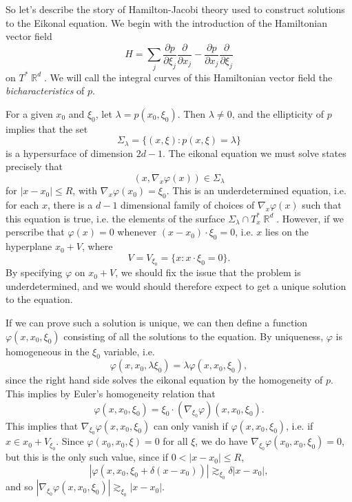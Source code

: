 \documentclass{article}
\theoremstyle{plain}
\theoremstyle{remark}
\theoremstyle{definition}
\DeclareMathOperator{\RR}{\mathbb{R}}
\begin{document}
So let's describe the story of Hamilton-Jacobi theory used to construct solutions to the Eikonal equation. We begin with the introduction of the Hamiltonian vector field
%
\[ H = \sum_j \frac{\partial p}{\partial \xi_j} \frac{\partial}{\partial x_j} - \frac{\partial p}{\partial x_j} \frac{\partial}{\partial \xi_j} \]
%
on $T^* \RR^d$. We will call the integral curves of this Hamiltonian vector field the \emph{bicharacteristics} of $p$.

For a given $x_0$ and $\xi_0$, let $\lambda = p(x_0,\xi_0)$. Then $\lambda \neq 0$, and the ellipticity of $p$ implies that the set
%
\[ \Sigma_\lambda = \{ (x,\xi) : p(x,\xi) = \lambda \} \]
%
is a hypersurface of dimension $2d - 1$. The eikonal equation we must solve states precisely that
%
\[ (x, \nabla_x \varphi(x)) \in \Sigma_\lambda \]
%
for $|x - x_0| \leq R$, with $\nabla_x \varphi(x_0) = \xi_0$. This is an underdetermined equation, i.e. for each $x$, there is a $d-1$ dimensional family of choices of $\nabla_x \varphi(x)$ such that this equation is true, i.e. the elements of the surface $\Sigma_\lambda \cap T^*_x \RR^d$. However, if we perscribe that $\varphi(x) = 0$ whenever $(x - x_0) \cdot \xi_0 = 0$, i.e. $x$ lies on the hyperplane $x_0 + V$, where
%
\[ V = V_{\xi_0} = \{ x: x \cdot \xi_0 = 0 \}. \]
%
By specifying $\varphi$ on $x_0 + V$, we should fix the issue that the problem is underdetermined, and we would should therefore expect to get a unique solution to the equation. 

If we can prove such a solution is unique, we can then define a function $\varphi(x,x_0,\xi_0)$ consisting of all the solutions to the equation. By uniqueness, $\varphi$ is homogeneous in the $\xi_0$ variable, i.e.
%
\[ \varphi(x,x_0,\lambda \xi_0) = \lambda \varphi(x,x_0,\xi_0), \]
%
since the right hand side solves the eikonal equation by the homogeneity of $p$. This implies by Euler's homogeneity relation that
%
\[ \varphi(x,x_0,\xi_0) = \xi_0 \cdot (\nabla_{\xi_0} \varphi)(x,x_0,\xi_0). \]
%
This implies that $\nabla_{\xi_0} \varphi(x,x_0,\xi_0)$ can only vanish if $\varphi(x,x_0,\xi_0)$, i.e. if $x \in x_0 + V_{\xi_0}$. Since $\varphi(x_0, x_0, \xi) = 0$ for all $\xi$, we do have $\nabla_{\xi_0} \varphi(x_0,x_0,\xi_0) = 0$, but this is the only such value, since if $0 < |x - x_0| \leq R$,
%
\[ |\varphi(x,x_0,\xi_0 + \delta ( x - x_0 ) )| \gtrsim_{\xi_0} \delta |x - x_0|, \]
%
and so $|\nabla_{\xi_0} \varphi(x,x_0,\xi_0)| \gtrsim_{\xi_0} |x - x_0|$.
\end{document}
